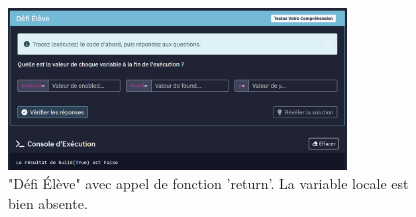 \documentclass[11pt,a4paper]{article}
\begin{document}
\begin{figure}[H]
    \centering
    \includegraphics[width=0.8\textwidth, keepaspectratio]{Defi_Console_def-f-a-return.png}
    \caption{"Défi Élève" avec appel de fonction 'return'. La variable locale est bien absente.}
    \label{Defi_Console_def-f-a-return.png}
\end{figure}
\end{document}
